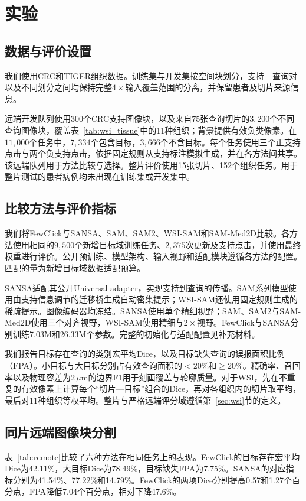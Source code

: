 \section{实验}
\label{sec:experiments}
\subsection{数据与评价设置}
我们使用CRC和TIGER组织数据。训练集与开发集按空间块划分，支持—查询对以及不同划分之间均保持完整$4\times$输入覆盖范围的分离，并保留患者及切片来源信息。

远端开发队列使用$300$个CRC支持图像块，以及来自$75$张查询切片的$3{,}200$个不同查询图像块，覆盖表~\ref{tab:wsi_tissue}中的11种组织；背景提供有效负类像素。在$11{,}000$个任务中，$7{,}334$个包含目标，$3{,}666$个不含目标。每个任务使用三个正支持点击与两个负支持点击，依据固定规则从支持标注模拟生成，并在各方法间共享。该远端队列用于方法比较与选择。整片评价使用15张切片、152个组织任务。用于整片测试的患者病例均未出现在训练集或开发集中。

\subsection{比较方法与评价指标}
\label{sec:baselines}
我们将FewClick与SANSA、SAM、SAM2、WSI-SAM和SAM-Med2D比较。各方法使用相同的$9{,}500$个新增目标域训练任务、$2{,}375$次更新及支持点击，并使用最终权重进行评价。公开预训练、模型架构、输入视野和适配模块遵循各方法的配置。匹配的量为新增目标域数据适配预算。

SANSA适配其公开Universal adapter，实现支持到查询的传播。SAM系列模型使用由支持信息调节的迁移桥生成自动密集提示；WSI-SAM还使用固定规则生成的稀疏提示。图像编码器均冻结。SANSA使用单个精细视野；SAM、SAM2与SAM-Med2D使用三个对齐视野，WSI-SAM使用精细与$2\times$视野。FewClick与SANSA分别训练7.03M和26.33M个参数。完整的初始化与适配配置见补充材料。

我们报告目标存在查询的类别宏平均Dice，以及目标缺失查询的误报面积比例（FPA）。小目标与大目标分别占有效查询面积的$<20\%$和$\geq20\%$。精确率、召回率以及物理容差为$2\,\mu$m的边界F1用于刻画覆盖与轮廓质量。对于WSI，先在不重复的有效像素上计算每个“切片—目标”组合的Dice，再对各组织内的切片取平均，最后对11种组织等权平均。整片与严格远端评分域遵循第~\ref{sec:wsi}节的定义。

\subsection{同片远端图像块分割}

表~\ref{tab:remote}比较了六种方法在相同任务上的表现。FewClick的目标存在宏平均Dice为42.11\%，大目标Dice为78.49\%，目标缺失FPA为7.75\%。SANSA的对应指标分别为41.54\%、77.22\%和14.79\%。FewClick的两项Dice分别提高0.57和1.27个百分点，FPA降低7.04个百分点，相对下降47.6\%。

